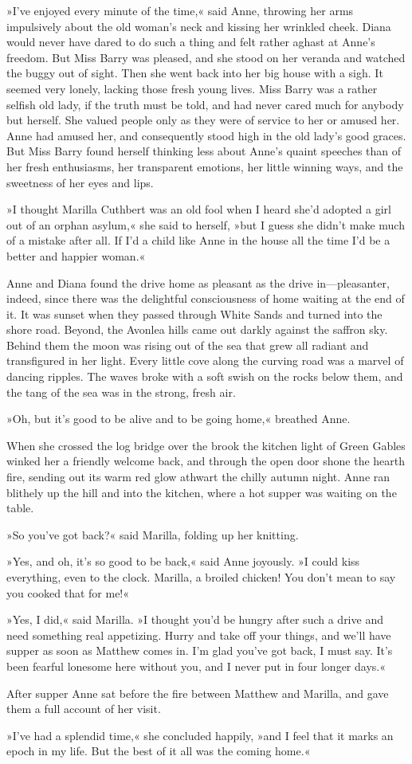 »I’ve enjoyed every minute of the time,« said Anne, throwing her arms impulsively about the old woman’s neck and kissing her wrinkled cheek. Diana would never have dared to do such a thing and felt rather aghast at Anne’s freedom. But Miss Barry was pleased, and she stood on her veranda and watched the buggy out of sight. Then she went back into her big house with a sigh. It seemed very lonely, lacking those fresh young lives. Miss Barry was a rather selfish old lady, if the truth must be told, and had never cared much for anybody but herself. She valued people only as they were of service to her or amused her. Anne had amused her, and consequently stood high in the old lady’s good graces. But Miss Barry found herself thinking less about Anne’s quaint speeches than of her fresh enthusiasms, her transparent emotions, her little winning ways, and the sweetness of her eyes and lips.

»I thought Marilla Cuthbert was an old fool when I heard she’d adopted a girl out of an orphan asylum,« she said to herself, »but I guess she didn’t make much of a mistake after all. If I’d a child like Anne in the house all the time I’d be a better and happier woman.«

Anne and Diana found the drive home as pleasant as the drive in—pleasanter, indeed, since there was the delightful consciousness of home waiting at the end of it. It was sunset when they passed through White Sands and turned into the shore road. Beyond, the Avonlea hills came out darkly against the saffron sky. Behind them the moon was rising out of the sea that grew all radiant and transfigured in her light. Every little cove along the curving road was a marvel of dancing ripples. The waves broke with a soft swish on the rocks below them, and the tang of the sea was in the strong, fresh air.

»Oh, but it’s good to be alive and to be going home,« breathed Anne.

When she crossed the log bridge over the brook the kitchen light of Green Gables winked her a friendly welcome back, and through the open door shone the hearth fire, sending out its warm red glow athwart the chilly autumn night. Anne ran blithely up the hill and into the kitchen, where a hot supper was waiting on the table.

»So you’ve got back?« said Marilla, folding up her knitting.

»Yes, and oh, it’s so good to be back,« said Anne joyously. »I could kiss everything, even to the clock. Marilla, a broiled chicken! You don’t mean to say you cooked that for me!«

»Yes, I did,« said Marilla. »I thought you’d be hungry after such a drive and need something real appetizing. Hurry and take off your things, and we’ll have supper as soon as Matthew comes in. I’m glad you’ve got back, I must say. It’s been fearful lonesome here without you, and I never put in four longer days.«

After supper Anne sat before the fire between Matthew and Marilla, and gave them a full account of her visit.

»I’ve had a splendid time,« she concluded happily, »and I feel that it marks an epoch in my life. But the best of it all was the coming home.«